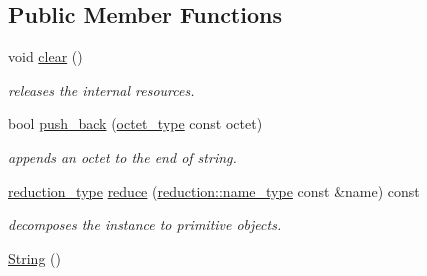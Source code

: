 \subsection*{Public Member Functions}
\begin{DoxyCompactItemize}
\item 
\hypertarget{classhryky_1_1http_1_1header_1_1comment_1_1_string_a71526c288578a8290a0e08f66991dd8f}{void \hyperlink{classhryky_1_1http_1_1header_1_1comment_1_1_string_a71526c288578a8290a0e08f66991dd8f}{clear} ()}\label{classhryky_1_1http_1_1header_1_1comment_1_1_string_a71526c288578a8290a0e08f66991dd8f}

\begin{DoxyCompactList}\small\item\em releases the internal resources. \end{DoxyCompactList}\item 
\hypertarget{classhryky_1_1http_1_1header_1_1comment_1_1_string_a35b55a5317edcf01589cf5a71cf57dc2}{bool \hyperlink{classhryky_1_1http_1_1header_1_1comment_1_1_string_a35b55a5317edcf01589cf5a71cf57dc2}{push\-\_\-back} (\hyperlink{namespacehryky_a488cba8b666be33ccca70e819684e3c8}{octet\-\_\-type} const octet)}\label{classhryky_1_1http_1_1header_1_1comment_1_1_string_a35b55a5317edcf01589cf5a71cf57dc2}

\begin{DoxyCompactList}\small\item\em appends an octet to the end of string. \end{DoxyCompactList}\item 
\hypertarget{classhryky_1_1http_1_1header_1_1comment_1_1_string_a59c3fd586cd488fc78ad6b6d29913a9e}{\hyperlink{namespacehryky_a343a9a4c36a586be5c2693156200eadc}{reduction\-\_\-type} \hyperlink{classhryky_1_1http_1_1header_1_1comment_1_1_string_a59c3fd586cd488fc78ad6b6d29913a9e}{reduce} (\hyperlink{namespacehryky_1_1reduction_ac686c30a4c8d196bbd0f05629a6b921f}{reduction\-::name\-\_\-type} const \&name) const }\label{classhryky_1_1http_1_1header_1_1comment_1_1_string_a59c3fd586cd488fc78ad6b6d29913a9e}

\begin{DoxyCompactList}\small\item\em decomposes the instance to primitive objects. \end{DoxyCompactList}\item 
\hypertarget{classhryky_1_1http_1_1header_1_1comment_1_1_string_ad63bf0d61ca6715dec26eb355126d4ec}{\hyperlink{classhryky_1_1http_1_1header_1_1comment_1_1_string_ad63bf0d61ca6715dec26eb355126d4ec}{String} ()}\label{classhryky_1_1http_1_1header_1_1comment_1_1_string_ad63bf0d61ca6715dec26eb355126d4ec}


\end{DoxyCompactItemize}
